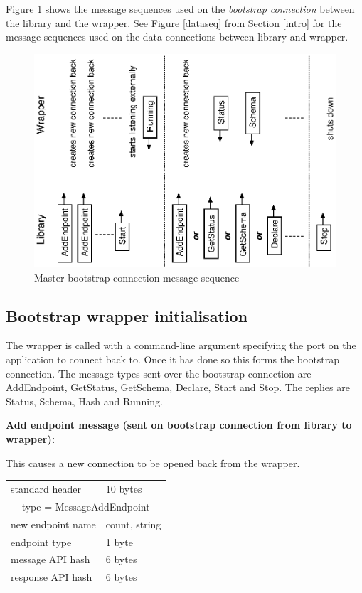 \documentclass[12pt,a4paper,twoside]{article}
\renewcommand{\_}{\texttt{\symbol{95}}}
\begin{document}
Figure \ref{controlseq} shows the message sequences
used on the \textit{bootstrap connection} between
the library and the wrapper. See Figure \ref{dataseq} from
Section \ref{intro} for the message sequences
used on the data connections between library and wrapper.

\begin{figure}[h]
\centering
\includegraphics[scale=1.0,angle=-90]{diagrams/controlseq.eps}
\caption{Master bootstrap connection message sequence}
\label{controlseq}
\end{figure}

\subsection{Bootstrap wrapper initialisation}

The wrapper is called with a command-line argument specifying the
port on the application to connect back to. Once it has done
so this forms the bootstrap connection. The message types
sent over the bootstrap connection are AddEndpoint, GetStatus,
GetSchema, Declare, Start and Stop. The replies are Status, Schema,
Hash and Running.

\textbf{Add endpoint message (sent on bootstrap connection from
library to wrapper):}

This causes a new connection to be opened back from the wrapper.

\begin{tabular}{|ll|}
\hline
standard header    & 10 bytes\\
\multicolumn{2}{|c|}{type = MessageAddEndpoint}\\
\hline
new endpoint name  & count, string\\
endpoint type      & 1 byte\\
message API hash   & 6 bytes\\
response API hash  & 6 bytes\\
\hline
\end{tabular}\\
\end{document}
